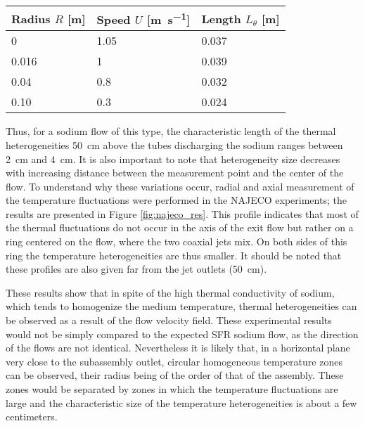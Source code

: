     \begin{table}
        \centering
\vspace{5truemm}
        \begin{tabular}{lll}
        Radius $R$ [\si{\meter}] & Speed $U$ [\si{\meter\per\second}] & Length $L_{\theta}$ [\si{\meter}] \\ \hline
        \num{0}              & \num{1.05}                 & \num{0.037}                    \\
        \num{0.016}          & \num{1}                    & \num{0.039}                    \\
        \num{0.04}           & \num{0.8}                  & \num{0.032}                    \\
        \num{0.10}           & \num{0.3}                  & \num{0.024}                    \\
        \end{tabular}
        \label{table:najeco}
    \end{table}

    Thus, for a sodium flow of this type, the characteristic length of the thermal heterogeneities \SI{50}{\centi\meter} above the tubes discharging the sodium
ranges between \SI{2}{\centi\meter} and \SI{4}{\centi\meter}. It is also important to note that heterogeneity size decreases with increasing distance between
the measurement point and the center of the flow. To understand why these variations occur, radial and axial measurement of the temperature fluctuations were
performed in the NAJECO experiments; the results are presented in Figure \ref{fig:najeco_res}.
    This profile indicates that most of the thermal fluctuations do not occur in the axis of the exit flow but rather on a ring centered on the flow, where the two
coaxial jets mix. On both sides of this ring the temperature heterogeneities are thus smaller. It should be noted that these profiles are also given far from
the jet outlets (\SI{50}{\centi\meter}).

    These results show that in spite of the high thermal conductivity of sodium, which tends to homogenize the medium temperature,
thermal heterogeneities can be observed as a result of the flow velocity field. These experimental results would not be simply compared to the expected SFR
sodium flow, as the direction of the flows are not identical.
Nevertheless it is likely that, in a horizontal plane very close to the subassembly outlet, circular homogeneous temperature zones can be observed,
their radius being of the order of that of the assembly. These zones would be separated by zones in which the temperature fluctuations
are large and the characteristic size of the temperature heterogeneities is about a few centimeters.

